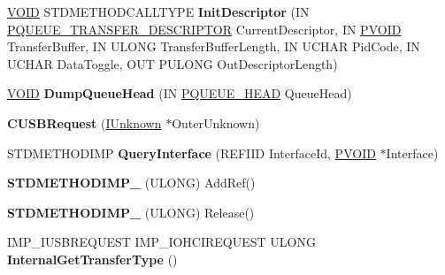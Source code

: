 \begin{DoxyCompactItemize}
\item 
\mbox{\label{class_c_u_s_b_request_a6a412db72958544ca8981b004945e4ee}} 
\hyperlink{interfacevoid}{V\+O\+ID} S\+T\+D\+M\+E\+T\+H\+O\+D\+C\+A\+L\+L\+T\+Y\+PE {\bfseries Init\+Descriptor} (IN \hyperlink{struct___q_u_e_u_e___t_r_a_n_s_f_e_r___d_e_s_c_r_i_p_t_o_r}{P\+Q\+U\+E\+U\+E\+\_\+\+T\+R\+A\+N\+S\+F\+E\+R\+\_\+\+D\+E\+S\+C\+R\+I\+P\+T\+OR} Current\+Descriptor, IN \hyperlink{interfacevoid}{P\+V\+O\+ID} Transfer\+Buffer, IN U\+L\+O\+NG Transfer\+Buffer\+Length, IN U\+C\+H\+AR Pid\+Code, IN U\+C\+H\+AR Data\+Toggle, O\+UT P\+U\+L\+O\+NG Out\+Descriptor\+Length)
\item 
\mbox{\label{class_c_u_s_b_request_a357621979c045498b4120aaac9981178}} 
\hyperlink{interfacevoid}{V\+O\+ID} {\bfseries Dump\+Queue\+Head} (IN \hyperlink{struct___q_u_e_u_e___h_e_a_d}{P\+Q\+U\+E\+U\+E\+\_\+\+H\+E\+AD} Queue\+Head)
\item 
\mbox{\label{class_c_u_s_b_request_a059d235428707fc6b43d4402b6f6fe52}} 
{\bfseries C\+U\+S\+B\+Request} (\hyperlink{interface_i_unknown}{I\+Unknown} $\ast$Outer\+Unknown)
\item 
\mbox{\label{class_c_u_s_b_request_a3d7d6989e63d96bf70a78666e643eb15}} 
S\+T\+D\+M\+E\+T\+H\+O\+D\+I\+MP {\bfseries Query\+Interface} (R\+E\+F\+I\+ID Interface\+Id, \hyperlink{interfacevoid}{P\+V\+O\+ID} $\ast$Interface)
\item 
\mbox{\label{class_c_u_s_b_request_ac0b1c70c2b98ff19e9a94b94b7fb460c}} 
{\bfseries S\+T\+D\+M\+E\+T\+H\+O\+D\+I\+M\+P\+\_\+} (U\+L\+O\+NG) Add\+Ref()
\item 
\mbox{\label{class_c_u_s_b_request_afed0e2345a488509c5260d555c2da79c}} 
{\bfseries S\+T\+D\+M\+E\+T\+H\+O\+D\+I\+M\+P\+\_\+} (U\+L\+O\+NG) Release()
\item 
\mbox{\label{class_c_u_s_b_request_a404cebb55c19445305721deab9c81fcc}} 
I\+M\+P\+\_\+\+I\+U\+S\+B\+R\+E\+Q\+U\+E\+ST I\+M\+P\+\_\+\+I\+O\+H\+C\+I\+R\+E\+Q\+U\+E\+ST U\+L\+O\+NG {\bfseries Internal\+Get\+Transfer\+Type} ()
\item 
\mbox{\label{class_c_u_s_b_request_a907750f1eae3e8941ed48e267dfa065c}} 

\end{DoxyCompactItemize}
